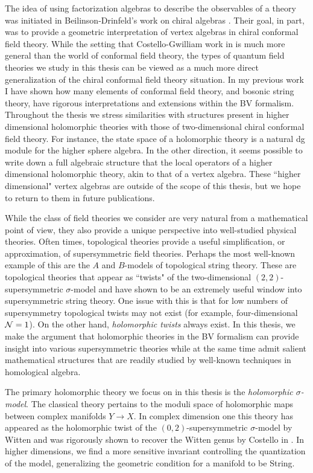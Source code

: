 The idea of using factorization algebras to describe the observables of a theory was initiated in Beilinson-Drinfeld's work on chiral algebras \cite{BD}. 
Their goal, in part, was to provide a geometric interpretation of vertex algebras in chiral conformal field theory. 
While the setting that Costello-Gwilliam work in is much more general than the world of conformal field theory, the types of quantum field theories we study in this thesis can be viewed as a much more direct generalization of the chiral conformal field theory situation. 
In my previous work \cite{BWVir, GGW, GWstring, GWsigma} I have shown how many elements of conformal field theory, and bosonic string theory, have rigorous interpretations and extensions within the BV formalism. 
Throughout the thesis we stress similarities with structures present in higher dimensional holomorphic theories with those of two-dimensional chiral conformal field theory. 
For instance, the state space of a holomorphic theory is a natural dg module for the higher sphere algebra.   
In the other direction, it seems possible to write down a full algebraic structure that the local operators of a higher dimensional holomorphic theory, akin to that of a vertex algebra. 
These ``higher dimensional" vertex algebras are outside of the scope of this thesis, but we hope to return to them in future publications. 

While the class of field theories we consider are very natural from a mathematical point of view, they also provide a unique perspective into well-studied physical theories. 
Often times, topological theories provide a useful simplification, or approximation, of supersymmetric field theories. 
Perhaps the most well-known example of this are the $A$ and $B$-models of topological string theory.
These are topological theories that appear as ``twists" of the two-dimensional $(2,2)$-supersymmetric $\sigma$-model and have shown to be an extremely useful window into supersymmetric string theory. 
One issue with this is that for low numbers of supersymmetry topological twists may not exist (for example, four-dimensional $\mathcal N=1$).
On the other hand, {\em holomorphic twists} always exist. 
In this thesis, we make the argument that holomorphic theories in the BV formalism can provide insight into various supersymmetric theories while at the same time admit salient mathematical structures that are readily studied by well-known techniques in homological algebra.

The primary holomorphic theory we focus on in this thesis is the {\em holomorphic $\sigma$-model}. 
The classical theory pertains to the moduli space of holomorphic maps between complex manifolds $Y \to X$. 
In complex dimension one this theory has appeared as the holomorphic twist of the $(0,2)$-supersymmetric $\sigma$-model by Witten \cite{WittenCDO} and was rigorously shown to recover the Witten genus by Costello in \cite{WG2}. 
In higher dimensions, we find a more sensitive invariant controlling the quantization of the model, generalizing the geometric condition for a manifold to be {\rm String}.

